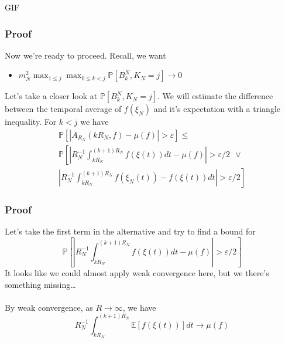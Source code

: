 \documentclass{beamer}
\begin{document}
\begin{frame}
    GIF
\end{frame}

\begin{frame}
    \frametitle{Proof}
    Now we're ready to proceed. Recall, we want

    \begin{itemize}
        \item $m_N^2\max_{1 \leq j}\max_{0 \leq k < j}\mathbb{P}\left[ B^N_k, K_{N} = j \right] \rightarrow 0$ 
    \end{itemize}

    Let's take a closer look at $\mathbb{P}\left[ B^N_k, K_{N} = j \right]$. We will estimate the difference between the temporal average of $f(\xi_N)$ and it's expectation with 
    a triangle inequality.
    For $k < j$ we have
    \begin{gather*}
        \mathbb{P}\left[  \left|A_{R_N}(kR_N, f) - \mu(f)\right| > \varepsilon \right] \leq \\
        \mathbb{P}\left[ \left|R_N^{-1}\int_{kR_N}^{(k+1)R_N}f(\xi(t))dt - \mu(f)\right| > \varepsilon/2 \ \ \lor \right.
        \\
        \left.\left|R_N^{-1}\int_{kR_N}^{(k+1)R_N}f(\xi_N(t)) - f(\xi(t))dt \right| > \varepsilon/2 \right]
    \end{gather*}

\end{frame}

\begin{frame}
    \frametitle{Proof}
    Let's take the first term in the alternative and try to find a bound for
    \[
        \mathbb{P}\left[ \left|R_N^{-1}\int_{kR_N}^{(k+1)R_N}f(\xi(t))dt - \mu(f)\right| > \varepsilon/2 \right]
    \]
    It looks like we could almost apply weak convergence here, but we there's something missing\dots \\~\\ 
    By weak convergence, as $R \rightarrow \infty$, we have
    \[
        R_N^{-1}\int_{kR_N}^{(k+1)R_N}\mathbb{E}\left[ f(\xi(t)) \right]dt \rightarrow \mu(f)
    \]
\end{frame}
\end{document}
